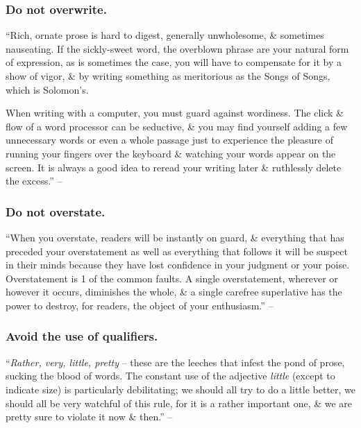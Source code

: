 \documentclass{article}
\begin{document}

\subsubsection{Do not overwrite.}
``Rich, ornate prose is hard to digest, generally unwholesome, \& sometimes nauseating. If the sickly-sweet word, the overblown phrase are your natural form of expression, as is sometimes the case, you will have to compensate for it by a show of vigor, \& by writing something as meritorious as the Songs of Songs, which is Solomon's.

When writing with a computer, you must guard against wordiness. The click \& flow of a word processor can be seductive, \& you may find yourself adding a few unnecessary words or even a whole passage just to experience the pleasure of running your fingers over the keyboard \& watching your words appear on the screen. It is always a good idea to reread your writing later \& ruthlessly delete the excess.'' -- \cite[p. 83]{Strunk_White_element_style}


\subsubsection{Do not overstate.}
``When you overstate, readers will be instantly on guard, \& everything that has preceded your overstatement as well as everything that follows it will be suspect in their minds because they have lost confidence in your judgment or your poise. Overstatement is 1 of the common faults. A single overstatement, wherever or however it occurs, diminishes the whole, \& a single carefree superlative has the power to destroy, for readers, the object of your enthusiasm.'' -- \cite[p. 84]{Strunk_White_element_style}


\subsubsection{Avoid the use of qualifiers.}
``{\it Rather, very, little, pretty} -- these are the leeches that infest the pond of prose, sucking the blood of words. The constant use of the adjective {\it little} (except to indicate size) is particularly debilitating; we should all try to do a little better, we should all be very watchful of this rule, for it is a rather important one, \& we are pretty sure to violate it now \& then.'' -- \cite[p. 85]{Strunk_White_element_style}
\end{document}
